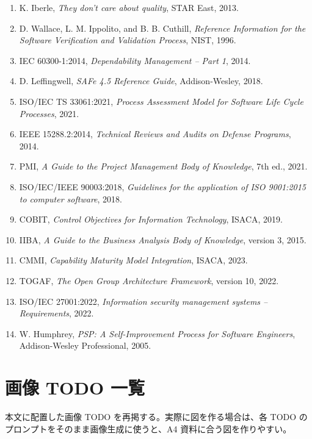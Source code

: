 \documentclass[11pt,a4paper]{article}
\begin{document}
\begin{enumerate}
  \item K. Iberle, \textit{They don't care about quality}, STAR East, 2013.
  \item D. Wallace, L. M. Ippolito, and B. B. Cuthill, \textit{Reference Information for the Software Verification and Validation Process}, NIST, 1996.
  \item IEC 60300-1:2014, \textit{Dependability Management -- Part 1}, 2014.
  \item D. Leffingwell, \textit{SAFe 4.5 Reference Guide}, Addison-Wesley, 2018.
  \item ISO/IEC TS 33061:2021, \textit{Process Assessment Model for Software Life Cycle Processes}, 2021.
  \item IEEE 15288.2:2014, \textit{Technical Reviews and Audits on Defense Programs}, 2014.
  \item PMI, \textit{A Guide to the Project Management Body of Knowledge}, 7th ed., 2021.
  \item ISO/IEC/IEEE 90003:2018, \textit{Guidelines for the application of ISO 9001:2015 to computer software}, 2018.
  \item COBIT, \textit{Control Objectives for Information Technology}, ISACA, 2019.
  \item IIBA, \textit{A Guide to the Business Analysis Body of Knowledge}, version 3, 2015.
  \item CMMI, \textit{Capability Maturity Model Integration}, ISACA, 2023.
  \item TOGAF, \textit{The Open Group Architecture Framework}, version 10, 2022.
  \item ISO/IEC 27001:2022, \textit{Information security management systems -- Requirements}, 2022.
  \item W. Humphrey, \textit{PSP: A Self-Improvement Process for Software Engineers}, Addison-Wesley Professional, 2005.
\end{enumerate}

\section{画像 TODO 一覧}
本文に配置した画像 TODO を再掲する。実際に図を作る場合は、各 TODO のプロンプトをそのまま画像生成に使うと、A4 資料に合う図を作りやすい。
\end{document}
